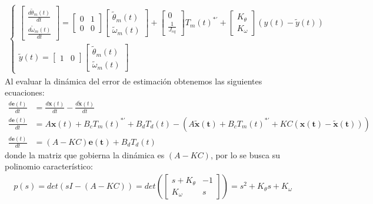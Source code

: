 \documentclass[a4paper, 10pt, onecolumn,journal]{ieeeconf}
\begin{document}
\begin{align}
	\begin{cases}
		\begin{bmatrix}
			\frac{d \tilde{\theta}_m(t)}{dt} \\ 
			\frac{d \tilde{\omega}_m(t)}{dt}
		\end{bmatrix} = 
		\begin{bmatrix}
			0 & 1 \\ 
			0 & 0
		\end{bmatrix}
		\begin{bmatrix}
			{\tilde{\theta}}_m(t) \\ 
			{\tilde{\omega}}_m(t)
		\end{bmatrix} + 
		\begin{bmatrix}
			0 \\ 
			\frac{1}{J_{eq}}
		\end{bmatrix} {T_m(t)}^{*'} + 
		\begin{bmatrix}
			K_{\theta} \\
			K_{\omega}
		\end{bmatrix} \left(y(t) - \tilde{y}(t) \right) \\
		\tilde{y}(t) = \begin{bmatrix}
			1 & 0
		\end{bmatrix} 
		\begin{bmatrix}
			{\tilde{\theta}}_m(t) \\ 
			{\tilde{\omega}}_m(t)
		\end{bmatrix}
	\end{cases}\label{ecuacion matricial de observador}
\end{align}
Al evaluar la dinámica del error de estimación obtenemos las siguientes ecuaciones: 
\begin{align}
	\frac{d \mathbf{e}(t)}{dt} &= \frac{d \mathbf{x}(t)}{dt} - \frac{d \mathbf{\tilde{x}} (t)}{dt}\\
	\frac{d \mathbf{e}(t)}{dt} &= A {\mathbf{x}(t)} + B_c {T_m(t)}^{*'} + B_d T_d(t) - \left( A \mathbf{\tilde{x} (t)} + B_c {T_m(t)}^{*'} + K C \left(\mathbf{x(t)} - \mathbf{\tilde{x} (t)} \right) \right) \\
	\frac{d \mathbf{e}(t)}{dt} &= \left(A - KC \right) {\mathbf{e(t)}} + B_d T_d(t)\label{dinamica del error de estimacion}
\end{align}
donde la matriz que gobierna la dinámica es $\left(A - KC \right)$, por lo se busca su polinomio característico:
\begin{align}
	p(s) = det\left(s I - \left( A - KC\right)  \right) = det\left(\begin{bmatrix}
		s + K_{\theta} & -1 \\ 
		K_{\omega} & s
	\end{bmatrix}  
	 \right) = s^2 + K_{\theta} s + K_{\omega} \label{polinomeo caracteristico de observador}
\end{align}
\end{document}
